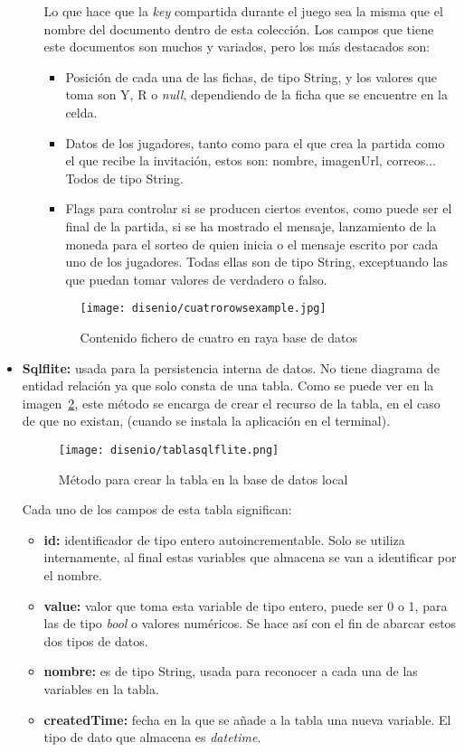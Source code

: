 \begin{itemize}
\begin{itemize}
		Lo que hace que la \emph{key} compartida durante el juego sea la misma que el nombre del documento dentro de esta colección. Los campos que tiene este documentos son muchos y variados, pero los más destacados son: 
		
		\begin{itemize}
			\item Posición de cada una de las fichas, de tipo String, y los valores que toma son Y, R o \emph{null}, dependiendo de la ficha que se encuentre en la celda.
			\item Datos de los jugadores, tanto como para el que crea la partida como el que recibe la invitación, estos son: nombre, imagenUrl, correos... Todos de tipo String.
			\item Flags para controlar si se producen ciertos eventos, como puede ser el final de la partida, si se ha mostrado el mensaje, lanzamiento de la moneda para el sorteo de quien inicia o el mensaje escrito por cada uno de los jugadores. Todas ellas son de tipo String, exceptuando las que puedan tomar valores de verdadero o falso.
		\end{itemize}
	
		\begin{figure}[H]
			\centering
			\texttt{[image: disenio/cuatrorowsexample.jpg]}
			\caption{Contenido fichero de cuatro en raya base de datos}\label{fig:cuatrorowsexample}
		\end{figure}
	\end{itemize}
	
	\item \textbf{Sqlflite:} usada para la persistencia interna de datos. No tiene diagrama de entidad relación ya que solo consta de una tabla. Como se puede ver en la imagen~\ref{fig:tablasqlflite}, este método se encarga de crear el recurso de la tabla, en el caso de que no existan, (cuando se instala la aplicación en el terminal).
	
	\begin{figure}[H]
		\centering
		\texttt{[image: disenio/tablasqlflite.png]}
		\caption{Método para crear la tabla en la base de datos local}\label{fig:tablasqlflite}
	\end{figure}

	Cada uno de los campos de esta tabla significan:
	\begin{itemize}
		\item \textbf{id:} identificador de tipo entero autoincrementable. Solo se utiliza internamente, al final estas variables que almacena se van a identificar por el nombre.
		\item \textbf{value:} valor que toma esta variable de tipo entero, puede ser 0 o 1, para las de tipo \emph{bool} o valores numéricos. Se hace así con el fin de abarcar estos dos tipos de datos.
		\item \textbf{nombre:} es de tipo String, usada para reconocer a cada una de las variables en la tabla.
		\item \textbf{createdTime:} fecha en la que se añade a la tabla una nueva variable. El tipo de dato que almacena es \emph{datetime}.
	\end{itemize}


\end{itemize}
